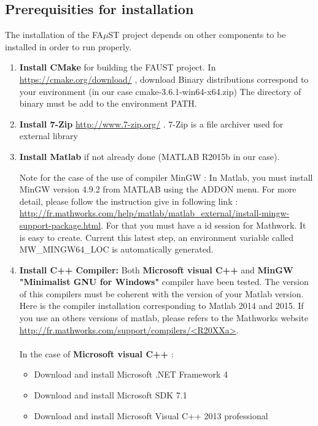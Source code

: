 \subsection{Prerequisities for installation}\label{sec:WinPrerequisitiesInstall}
The installation of the FA$\mu$ST project depends on other components to be installed in order to run properly. 
\begin{enumerate}

\item \textbf{Install CMake} for building the FAUST project. 
In \url{https://cmake.org/download/} , download Binary distributions correspond to your environment (in our case  cmake-3.6.1-win64-x64.zip)
The directory of binary must be add to the environment PATH. 

\item \textbf{Install 7-Zip} \url{http://www.7-zip.org/} . 7-Zip is a file archiver used for external library

\item \textbf{Install Matlab} if not already done (MATLAB R2015b in our case).

Note for the case of the use of compiler MinGW : In Matlab, you must install MinGW version 4.9.2 from MATLAB using the ADDON menu. For more detail, please follow the instruction give in following link :  
\url{http://fr.mathworks.com/help/matlab/matlab_external/install-mingw-support-package.html}. For that you must have a id session for Mathwork. It is easy to create. 
Current this latest step, an environment variable called MW\_MINGW64\_LOC is automatically generated. 


\item \textbf{Install C++ Compiler:} Both \textbf{Microsoft visual C++} and \textbf{MinGW "Minimalist GNU for Windows"} compiler have been tested. The version of this compilers must be coherent with the version of your Matlab version. Here is the compiler installation corresponding to Matlab 2014 and 2015. If you use an others versions of matlab, please refers to the Mathworks website \url{http://fr.mathworks.com/support/compilers/<R20XXa>}.

\paragraph{}In the case of \textbf{Microsoft visual C++} :
\begin{itemize}
\item Download and install Microsoft .NET Framework 4
\item Download and install Microsoft SDK 7.1
\item Download and install Microsoft Visual C++ 2013 professional
\end{itemize}


\end{enumerate}
